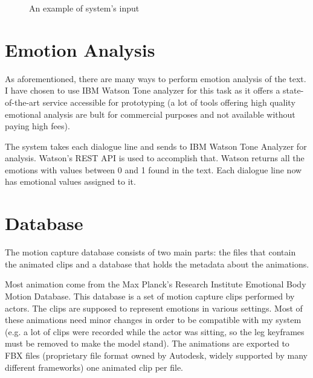 \begin{figure}[!ht]
\centerline{}
\caption{An example of system's input}\label{fig:inputscript}
\end{figure}


\section{Emotion Analysis} 
\label{sec:emoanal}
As aforementioned, there are many ways to perform emotion analysis of the text. I have chosen to use IBM Watson Tone analyzer for this task as it offers a state-of-the-art service accessible for prototyping (a lot of tools offering high quality emotional analysis are bult for commercial purposes and not available without paying high fees).

The system takes each dialogue line and sends to IBM Watson Tone Analyzer for analysis. Watson's REST API is used to accomplish that. Watson returns all the emotions with values between 0 and 1 found in the text. Each dialogue line now has emotional values assigned to it.

\section{Database}

The motion capture database consists of two main parts: the files that contain the animated clips and a database that holds the metadata about the animations.

Most animation come from the Max Planck's Research Institute Emotional Body Motion Database. This database is a set of motion capture clips performed by actors. The clips are supposed to represent emotions in various settings. Most of these animations need minor changes in order to be compatible with my system (e.g. a lot of clips were recorded while the actor was sitting, so the leg keyframes must be removed to make the model stand). The animations are exported to FBX files (proprietary file format owned by Autodesk, widely supported by many different frameworks) one animated clip per file.

